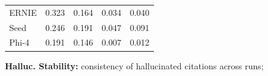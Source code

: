 \begin{table}[t]
\begin{threeparttable}
\begin{tabular}{lcccc}
\cellcolor{tableRowLight}ERNIE & \cellcolor{green!12}0.323 & \cellcolor{green!12}0.164 & \cellcolor{red!10}0.034 & \cellcolor{red!10}0.040 \\
\cellcolor{tableRowWhite}Seed & \cellcolor{green!10}0.246 & \cellcolor{green!10}0.191 & \cellcolor{red!10}0.047 & \cellcolor{red!10}0.091 \\
\cellcolor{tableRowLight}Phi-4 & \cellcolor{green!8}0.191 & \cellcolor{green!8}0.146 & \cellcolor{red!6}0.007 & \cellcolor{red!6}0.012 \\
\bottomrule
\end{tabular}
    \begin{tablenotes}
      \footnotesize
      \item \colorbox{red!28}{\textbf{Halluc. Stability:}} consistency of hallucinated citations across runs;
    \end{tablenotes}
  \end{threeparttable}
\end{table}

